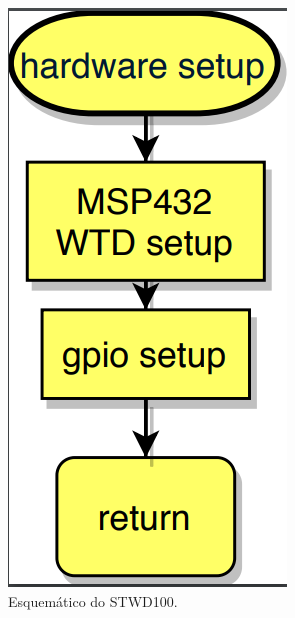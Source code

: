 \begin{apendicesenv}
\begin{figure}[!h]
	\centerfloat
	\centering
	\includegraphics[keepaspectratio=true,scale=0.5]{figuras/flowChart_hardware.PNG}
	\caption{Esquemático do STWD100.}
	\label{flowChart_hardware}
\end{figure}


\end{apendicesenv}
